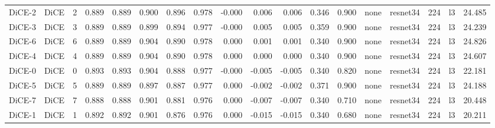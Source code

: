 \begin{tabular}{llrrrrrrrrrrrllllr}
   DiCE-2 &   DiCE &      2 &            0.889 &         0.889 &        0.900 &                   0.896 &       0.978 &              -0.000 &          0.006 &             0.006 &          0.346 &              0.900 &       none & resnet34 &        224 &     l3 &       24.485 \\
   DiCE-3 &   DiCE &      3 &            0.889 &         0.889 &        0.899 &                   0.894 &       0.977 &              -0.000 &          0.005 &             0.005 &          0.359 &              0.900 &       none & resnet34 &        224 &     l3 &       24.239 \\
   DiCE-6 &   DiCE &      6 &            0.889 &         0.889 &        0.904 &                   0.890 &       0.978 &               0.000 &          0.001 &             0.001 &          0.340 &              0.900 &       none & resnet34 &        224 &     l3 &       24.826 \\
   DiCE-4 &   DiCE &      4 &            0.889 &         0.889 &        0.904 &                   0.890 &       0.978 &               0.000 &          0.000 &             0.000 &          0.340 &              0.900 &       none & resnet34 &        224 &     l3 &       24.607 \\
   DiCE-0 &   DiCE &      0 &            0.893 &         0.893 &        0.904 &                   0.888 &       0.977 &              -0.000 &         -0.005 &            -0.005 &          0.340 &              0.820 &       none & resnet34 &        224 &     l3 &       22.181 \\
   DiCE-5 &   DiCE &      5 &            0.889 &         0.889 &        0.897 &                   0.887 &       0.977 &               0.000 &         -0.002 &            -0.002 &          0.371 &              0.900 &       none & resnet34 &        224 &     l3 &       24.188 \\
   DiCE-7 &   DiCE &      7 &            0.888 &         0.888 &        0.901 &                   0.881 &       0.976 &               0.000 &         -0.007 &            -0.007 &          0.340 &              0.710 &       none & resnet34 &        224 &     l3 &       20.448 \\
   DiCE-1 &   DiCE &      1 &            0.892 &         0.892 &        0.901 &                   0.876 &       0.976 &               0.000 &         -0.015 &            -0.015 &          0.340 &              0.680 &       none & resnet34 &        224 &     l3 &       20.211 \\
\bottomrule
\end{tabular}
